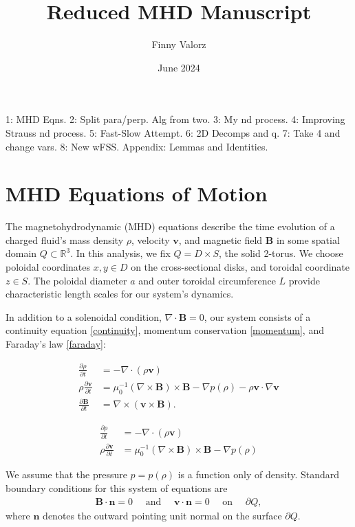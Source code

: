\documentclass{article}
\title{Reduced MHD Manuscript}
\author{Finny Valorz}
\date{June 2024}
\newcommand{\p}{\partial}
\newcommand{\deriv}[2]{\frac{\p #1}{\p #2}}
\newcommand{\pth} [1] {\left( #1 \right) }
\begin{document}
\maketitle


\begin{abstract}
    
\end{abstract}

1: MHD Eqns. 2: Split para/perp. Alg from two. 3: My nd process. 4: Improving Strauss nd process. 5: Fast-Slow Attempt. 6: 2D Decomps and q. 7: Take 4 and change vars. 8: New wFSS. Appendix: Lemmas and Identities. 

\section{MHD Equations of Motion} 
The magnetohydrodynamic (MHD) equations describe the time evolution of a charged fluid's mass density $\rho$, velocity $\bm{v}$, and magnetic field $\bm{B}$ in some spatial domain $Q\subset \mathbb{R}^3$. In this analysis, we fix $Q=D\times S$, the solid 2-torus. We choose poloidal coordinates $x,y\in D$ on the cross-sectional disks, and toroidal coordinate $z \in S$. The poloidal diameter $a$ and outer toroidal circumference $L$ provide characteristic length scales for our system's dynamics. 

In addition to a solenoidal condition, $\nabla\cdot \bm{B}=0$, our system consists of a continuity equation \eqref{continuity}, momentum conservation \eqref{momentum}, and Faraday's law \eqref{faraday}:

\begin{align}
    \deriv{\rho}{t} &= -\nabla\cdot \pth{\rho \bm{v}} \label{continuity} \\ 
    \rho\deriv{\bm{v}}{t} &= \mu_0^{-1} \pth{\nabla\times \bm{B}} \times \bm{B} - \nabla p(\rho) - \rho \bm{v}\cdot\nabla \bm{v} \label{momentum} \\ 
    \deriv{\bm{B}}{t} &= \nabla \times \pth{\bm{v}\times \bm{B}}. \label{faraday}
\end{align}

\begin{align*}
    \frac{\partial\rho}{\partial t} &= -\nabla\cdot (\rho \bm{v}) \\ 
    \rho \frac{\partial \bm{v}}{\partial t} &= \mu_0^{-1} (\nabla\times\bm{B})\times\bm{B} - \nabla p(\rho) 
\end{align*}

We assume that the pressure $p=p(\rho)$ is a function only of density. Standard boundary conditions for this system of equations are
\begin{align*} 
    \bm{B}\cdot \bm{n} = 0 \quad \text{ and }\quad  \bm{v}\cdot \bm{n} = 0 \quad \text{ on }\quad \p Q,
\end{align*}
where $\bm{n}$ denotes the outward pointing unit normal on the surface $\p Q$. 
\end{document}

